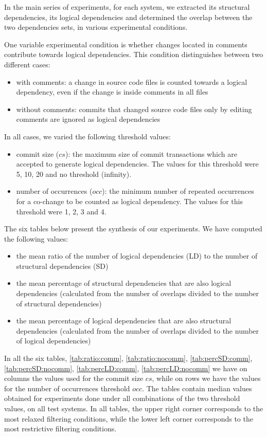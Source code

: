 \documentclass[a4paper,twoside]{article}
\begin{document}
In the main series of experiments, for each system, we extracted its structural dependencies, its logical dependencies and determined the overlap between the two dependencies sets, in various experimental conditions. 

One variable experimental condition is whether changes located in comments contribute towards logical dependencies. This condition distinguishes between two different cases: 
\begin{itemize}
	\item with comments: a change in source code files is counted towards a logical dependency, even if the change is inside comments in all files
	\item without comments: commits that changed source code files only by editing comments are ignored as logical dependencies
\end{itemize}

In all cases, we varied the following threshold values: 
 \begin{itemize}
	\item commit size ($cs$): the maximum size of commit transactions which are accepted to generate logical dependencies. The values for this threshold were 5, 10, 20 and no threshold (infinity).  
	\item number of occurrences ($occ$): the minimum number of repeated occurrences for a co-change to be counted as logical dependency. The values for this threshold were 1, 2, 3 and 4.  
\end{itemize}

The six tables below present the synthesis of our experiments. 
We have computed the following  values:
\begin{itemize}
	\item the mean ratio of the number of logical dependencies  (LD) to the number of structural dependencies (SD)
   \item the mean percentage of structural dependencies that are also logical dependencies (calculated from the number of overlaps divided to the number of structural dependencies)	
		\item the mean percentage of logical dependencies that are also structural dependencies (calculated from the number of overlaps divided to the number of logical dependencies)
\end{itemize}

In all the six tables, \ref{tab:ratio:comm}, \ref{tab:ratio:nocomm}, \ref{tab:percSD:comm}, \ref{tab:percSD:nocomm},
\ref{tab:percLD:comm}, \ref{tab:percLD:nocomm} we have on columns the values used for the commit size $cs$, while on rows we have the values for the number of occurrences threshold $occ$. The tables contain median values obtained for experiments done under all combinations of the two threshold values, on all test systems. In all tables, the upper right corner corresponds to the most relaxed filtering conditions, while the lower left corner corresponds to the most restrictive filtering conditions.
\end{document}
